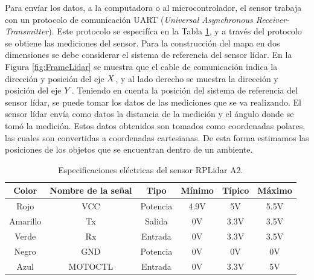 Para envíar los datos, a la computadora o al microcontrolador, el sensor trabaja con un 
protocolo de comunicación UART (\textit{Universal Asynchronous Receiver-Transmitter}). Este 
protocolo se especifíca en la Tabla \ref{tbl:comunicacion}, y a través del protocolo se 
obtiene las mediciones del sensor. Para la construcción del mapa en dos dimensiones se 
debe considerar el sistema de referencia del sensor lídar. En la Figura \ref{fig:FrameLidar} 
se muestra que el cable de comunicación indica la dirección y posición del eje $\mathnormal X$, y al 
lado derecho se muestra la dirección y posición del eje $\mathnormal Y$. Teniendo en cuenta la 
posición del sistema de referencia del sensor lídar, se puede tomar los datos de 
las mediciones que se va realizando. El sensor lídar envía como datos la distancia de la medición y 
el ángulo donde se tomó la medición. Estos datos obtenidos son tomados como coordenadas 
polares, las cuales son convertidas a coordenadas cartesianas. De esta forma estimamos las 
posiciones de los objetos que se encuentran dentro de un ambiente.


\begin{table}[htbp]
\begin{center}
\begin{tabular}{|c|c|c|c|c|c|}
	\hline
	Color & Nombre de la señal & Tipo & Mínimo & Típico & Máximo \\ 
	\hline \hline
	Rojo & VCC & Potencia & 4.9V & 5V & 5.5V \\ \hline
	Amarillo & Tx & Salida & 0V & 3.3V & 3.5V \\ \hline
	Verde & Rx & Entrada & 0V & 3.3V & 3.5V \\ \hline
	Negro & GND & Potencia & 0V & 0V & 0V \\ \hline
	Azul & MOTOCTL & Entrada & 0V & 3.3V & 5V \\ \hline
\end{tabular}
	\caption{Especificaciones eléctricas del sensor RPLidar A2.}
	\label{tbl:comunicacion}
\end{center}
\end{table}


